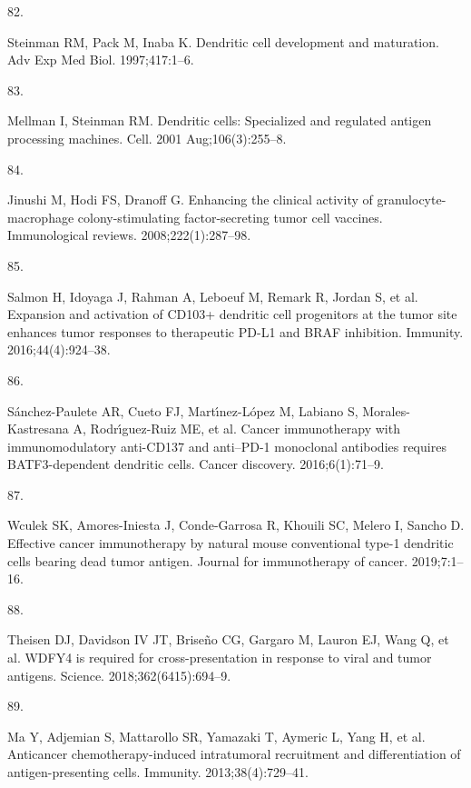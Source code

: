 \documentclass[
]{article}
\newlength{\cslhangindent}
\newlength{\csllabelwidth}
\newenvironment{CSLReferences}[2] %
 {\begin{list}{}{%
  \setlength{\itemindent}{0pt}
  \setlength{\leftmargin}{0pt}
  \setlength{\parsep}{0pt}
  \ifodd #1
   \setlength{\leftmargin}{\cslhangindent}
   \setlength{\itemindent}{-1\cslhangindent}
  \fi
  \setlength{\itemsep}{#2\baselineskip}}}
 {\end{list}}
\newcommand{\CSLLeftMargin}[1]{\parbox[t]{\csllabelwidth}{\strut#1\strut}}
\newcommand{\CSLRightInline}[1]{\parbox[t]{\linewidth - \csllabelwidth}{\strut#1\strut}}
\begin{document}
\begin{CSLReferences}{0}{1}
\CSLLeftMargin{82. }%
\CSLRightInline{Steinman RM, Pack M, Inaba K. Dendritic cell development
and maturation. Adv Exp Med Biol. 1997;417:1--6. }

\CSLLeftMargin{83. }%
\CSLRightInline{Mellman I, Steinman RM. Dendritic cells: Specialized and
regulated antigen processing machines. Cell. 2001 Aug;106(3):255--8. }

\CSLLeftMargin{84. }%
\CSLRightInline{Jinushi M, Hodi FS, Dranoff G. Enhancing the clinical
activity of granulocyte-macrophage colony-stimulating factor-secreting
tumor cell vaccines. Immunological reviews. 2008;222(1):287--98. }

\CSLLeftMargin{85. }%
\CSLRightInline{Salmon H, Idoyaga J, Rahman A, Leboeuf M, Remark R,
Jordan S, et al. Expansion and activation of CD103+ dendritic cell
progenitors at the tumor site enhances tumor responses to therapeutic
PD-L1 and BRAF inhibition. Immunity. 2016;44(4):924--38. }

\CSLLeftMargin{86. }%
\CSLRightInline{Sánchez-Paulete AR, Cueto FJ, Martı́nez-López M, Labiano
S, Morales-Kastresana A, Rodrı́guez-Ruiz ME, et al. Cancer immunotherapy
with immunomodulatory anti-CD137 and anti--PD-1 monoclonal antibodies
requires BATF3-dependent dendritic cells. Cancer discovery.
2016;6(1):71--9. }

\CSLLeftMargin{87. }%
\CSLRightInline{Wculek SK, Amores-Iniesta J, Conde-Garrosa R, Khouili
SC, Melero I, Sancho D. Effective cancer immunotherapy by natural mouse
conventional type-1 dendritic cells bearing dead tumor antigen. Journal
for immunotherapy of cancer. 2019;7:1--16. }

\CSLLeftMargin{88. }%
\CSLRightInline{Theisen DJ, Davidson IV JT, Briseño CG, Gargaro M,
Lauron EJ, Wang Q, et al. WDFY4 is required for cross-presentation in
response to viral and tumor antigens. Science. 2018;362(6415):694--9. }

\CSLLeftMargin{89. }%
\CSLRightInline{Ma Y, Adjemian S, Mattarollo SR, Yamazaki T, Aymeric L,
Yang H, et al. Anticancer chemotherapy-induced intratumoral recruitment
and differentiation of antigen-presenting cells. Immunity.
2013;38(4):729--41. }


\end{CSLReferences}
\end{document}

